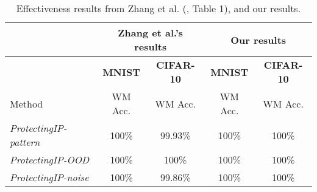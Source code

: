 \begin{table}
\small
\centering
\caption{Effectiveness results from Zhang et al. (\cite{zhang_protecting_2018}, Table 1), and our results.}
\label{fig:results-effectiveness:protecting}
\begin{tabular}{|l|c|c|c|c|}
\hline
                              & \multicolumn{2}{c|}{Zhang et al.'s results} & \multicolumn{2}{c|}{Our results}   \\ \hline
                              & \textbf{MNIST}  & \textbf{CIFAR-10} & \textbf{MNIST} & \textbf{CIFAR-10} \\ \hline
Method                        & WM Acc.         & WM Acc.           & WM Acc.        & WM Acc.           \\ \hline
\textit{ProtectingIP-pattern} & 100\%           & 99.93\%           & 100\%          & {\color[HTML]{036400} 100\%}             \\ \hline
\textit{ProtectingIP-OOD}     & 100\%           & 100\%             & 100\%          & 100\%             \\ \hline
\textit{ProtectingIP-noise}   & 100\%           & 99.86\%           & 100\%          & {\color[HTML]{036400} 100\%}             \\ \hline
\end{tabular}
\end{table}